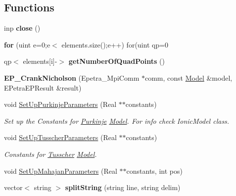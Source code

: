 \subsection*{Functions}
\begin{DoxyCompactItemize}
\item 
\hypertarget{namespacevoom_a0fc16b6df880da9ce71c59a0b154a69f}{
inp {\bfseries close} ()}
\label{namespacevoom_a0fc16b6df880da9ce71c59a0b154a69f}

\item 
\hypertarget{namespacevoom_a74dedd3125bcc5508111ca6c4c96afdc}{
{\bfseries for} (uint e=0;e$<$ elements.size();e++) for(uint qp=0}
\label{namespacevoom_a74dedd3125bcc5508111ca6c4c96afdc}

\item 
\hypertarget{namespacevoom_a307df5655294fdce7cd310059ec404cf}{
qp$<$ elements\mbox{[}i\mbox{]}-\/$>$ {\bfseries getNumberOfQuadPoints} ()}
\label{namespacevoom_a307df5655294fdce7cd310059ec404cf}

\item 
\hypertarget{namespacevoom_af2702eef77261bb83ce6aa820c102d1a}{
{\bfseries EP\_\-CrankNicholson} (Epetra\_\-MpiComm $\ast$comm, const \hyperlink{classvoom_1_1_model}{Model} \&model, EPetraEPResult \&result)}
\label{namespacevoom_af2702eef77261bb83ce6aa820c102d1a}

\item 
\hypertarget{namespacevoom_af0e86d2e771c9c29467a049181e64ccd}{
void \hyperlink{namespacevoom_af0e86d2e771c9c29467a049181e64ccd}{SetUpPurkinjeParameters} (Real $\ast$$\ast$constants)}
\label{namespacevoom_af0e86d2e771c9c29467a049181e64ccd}

\begin{DoxyCompactList}\small\item\em Set up the Constants for \hyperlink{classvoom_1_1_purkinje}{Purkinje} \hyperlink{classvoom_1_1_model}{Model}. For info check IonicModel class. \item\end{DoxyCompactList}\item 
\hypertarget{namespacevoom_a4889fa799c04dc67ff9ea0c72cd3885b}{
void \hyperlink{namespacevoom_a4889fa799c04dc67ff9ea0c72cd3885b}{SetUpTusscherParameters} (Real $\ast$$\ast$constants)}
\label{namespacevoom_a4889fa799c04dc67ff9ea0c72cd3885b}

\begin{DoxyCompactList}\small\item\em Constants for \hyperlink{classvoom_1_1_tusscher}{Tusscher} \hyperlink{classvoom_1_1_model}{Model}. \item\end{DoxyCompactList}\item 
void \hyperlink{namespacevoom_a72a608e668a052d7b2a6f26a6e286702}{SetUpMahajanParameters} (Real $\ast$$\ast$constants, int pos)
\item 
\hypertarget{namespacevoom_a577e52aca11c2b782ad730edf75ba2a2}{
vector$<$ string $>$ {\bfseries splitString} (string line, string delim)}
\label{namespacevoom_a577e52aca11c2b782ad730edf75ba2a2}


\end{DoxyCompactItemize}
